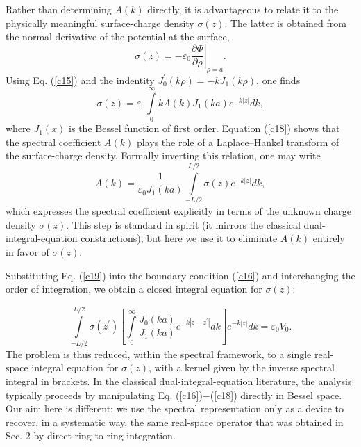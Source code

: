 \documentclass[12pt]{article}
\begin{document}
Rather than determining $A(k)$ directly, it is advantageous to relate it to
the physically meaningful surface-charge density $\sigma(z)$. The latter is
obtained from the normal derivative of the potential at the surface,%
\begin{equation}
\sigma(z)=-\varepsilon_{0}\left.  \frac{\partial\Phi}{\partial\rho}\right|
_{\rho=a}. \label{c17}%
\end{equation}
Using Eq. (\ref{c15}) and the indentity $J_{0}^{\prime}(k\rho)=-kJ_{1}(k\rho
)$, one finds%
\begin{equation}
\sigma(z)=\varepsilon_{0}\int\limits_{0}^{\infty}kA(k)J_{1}(ka)e^{-k\left|
z\right|  }dk, \label{c18}%
\end{equation}
where $J_{1}(x)$ is the Bessel function of first order. Equation (\ref{c18})
shows that the spectral coefficient $A(k)$ plays the role of a Laplace--Hankel
transform of the surface-charge density. Formally inverting this relation, one
may write%
\begin{equation}
A(k)=\frac{1}{\varepsilon_{0}J_{1}(ka)}\int\limits_{-L/2}^{L/2}\sigma
(z)e^{-k\left|  z\right|  }dk, \label{c19}%
\end{equation}
which expresses the spectral coefficient explicitly in terms of the unknown
charge density $\sigma(z)$. This step is standard in spirit (it mirrors the
classical dual-integral-equation constructions\cite{c3,c4}), but here we use
it to eliminate $A(k)$ entirely in favor of $\sigma(z)$.

Substituting Eq. (\ref{c19}) into the boundary condition (\ref{c16}) and
interchanging the order of integration, we obtain a closed integral equation
for $\sigma(z)$:%

\begin{equation}
\int\limits_{-L/2}^{L/2}\sigma(z^{\prime})\left[  \int\limits_{0}^{\infty
}\frac{J_{0}(ka)}{J_{1}(ka)}e^{-k\left|  z-z^{\prime}\right|  }dk\right]
e^{-k\left|  z\right|  }dk=\varepsilon_{0}V_{0}. \label{c20}%
\end{equation}
The problem is thus reduced, within the spectral framework, to a single
real-space integral equation for $\sigma(z)$, with a kernel given by the
inverse spectral integral in brackets. In the classical dual-integral-equation
literature\cite{c3,c4}, the analysis typically proceeds by manipulating Eq.
(\ref{c16})$-$(\ref{c18}) directly in Bessel space. Our aim here is different:
we use the spectral representation only as a device to recover, in a
systematic way, the same real-space operator that was obtained in Sec. 2 by
direct ring-to-ring integration.
\end{document}
